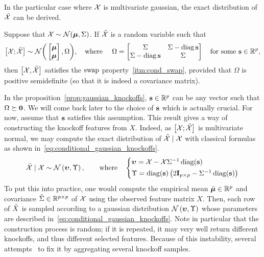 In the particular case where $\mathcal{X}$ is multivariate gaussian, the exact distribution of $\tilde{\mathcal{X}}$ can be derived.
\begin{proposition}
    Suppose that $\mathcal{X} \sim \mathcal{N}(\bm{\mu}, \Sigma)$.
    If $\tilde{\mathcal{X}}$ is a random variable such that
    \begin{equation*}
        \big[ \mathcal{X}; \tilde{\mathcal{X}} \big] \sim \mathcal{N}\bigg(\begin{bmatrix} \bm{\mu}\\ \bm{\mu} \end{bmatrix}, \Omega\bigg)
        ,\quad\text{where }\quad
        \Omega = \begin{bmatrix}
            \Sigma & \Sigma - \operatorname*{diag} \mathbf{s}\\
            \Sigma - \operatorname*{diag} \mathbf{s} & \Sigma
        \end{bmatrix}
        \quad\text{for some }
        \mathbf{s} \in \mathbb{R}^p,
    \end{equation*}
    then $\big[\mathcal{X}, \tilde{\mathcal{X}} \big]$ satisfies the $\operatorname{swap}$ property~\ref{itm:cond_swap},
    provided that $\Omega$ is positive semidefinite (so that it is indeed a covariance matrix).
\end{proposition}\label{prop:gaussian_knockoffs}
In the proposition~\ref{prop:gaussian_knockoffs},
$\mathbf{s} \in \mathbb{R}^p$ can be any vector such that $\Omega \succeq \mathbf{0}$.
We will come back later to the choice of $\mathbf{s}$ which is actually crucial.
For now, assume that $\mathbf{s}$ satisfies this assumption.
This result gives a way of constructing the knockoff features from $X$.
Indeed, as $\big[ \mathcal{X}; \tilde{\mathcal{X}} \big]$ is multivariate normal, we may compute the exact distribution of
$\tilde{\mathcal{X}} \mid \mathcal{X}$ with classical formulas~\cite{conditional_normal} as shown in~\ref{eq:conditional_gaussian_knockoffs}.
\begin{equation}\label{eq:conditional_gaussian_knockoffs}
    \tcX \mid \cX \sim \cN\left( \bupsilon, \Upsilon \right)
    ,\qquad\text{where}\quad
    \begin{cases*}
        \bupsilon = \cX - \cX\Sigma^{-1}\diag(\bs)\\
        \Upsilon = \diag(\bs)\left( 2\mI_{p \times p} - \Sigma^{-1}\diag(\bs) \right)
    \end{cases*}
\end{equation}
To put this into practice, one would compute the empirical mean
$\hat{\bm{\mu}} \in \mathbb{R}^p$ and covariance $\hat{\Sigma} \in \mathbb{R}^{p \times p}$ of $\mathcal{X}$
using the observed feature matrix $X$.
Then, each row of $\tilde{X}$ is sampled according to a gaussian distribution $\mathcal{N}\left( \bm{\upsilon}, \Upsilon \right)$
whose parameters are described in~\ref{eq:conditional_gaussian_knockoffs}.
Note in particular that the construction process is random;
if it is repeated, it may very well return different knockoffs, and thus different
selected features.
Because of this instability, several attempts~\cite{improve_stability_knockoffs} to fix it by
aggregating several knockoff samples.

